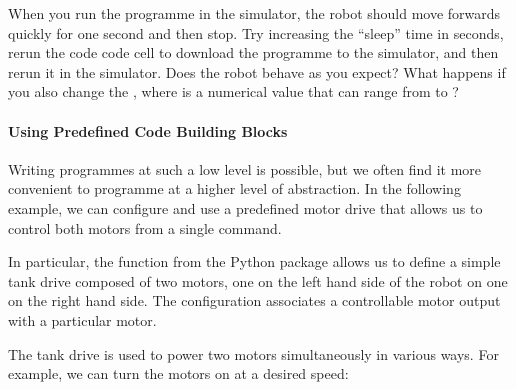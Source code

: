 \documentclass[letterpaper,10pt,english]{sphinxmanual}
\begin{document}

When you run the programme in the simulator, the robot should move forwards quickly for one second and then stop. Try increasing the “sleep” time in seconds, re\sphinxhyphen{}run the code code cell to download the programme to the simulator, and then re\sphinxhyphen{}run it in the simulator. Does the robot behave as you expect? What happens if you also change the , where  is a numerical value that can range from  to ?


\paragraph{Using Predefined Code Building Blocks}
\label{\detokenize{content/01_Robot_Lab/Section_00_01:Using-Predefined-Code-Building-Blocks}}
Writing programmes at such a low level is possible, but we often find it more convenient to programme at a higher level of abstraction. In the following example, we can configure and use a predefined motor drive that allows us to control both motors from a single command.

In particular, the  function from the  Python package allows us to define a simple tank drive composed of two motors, one on the left hand side of the robot on one on the right hand side. The configuration associates a controllable motor output with a particular motor.

\begin{sphinxVerbatim}[commandchars=\\\{\}]
   
\end{sphinxVerbatim}

The tank drive is used to power two motors simultaneously in various ways. For example, we can turn the motors on at a desired speed:

\begin{sphinxVerbatim}[commandchars=\\\{\}]
 
\end{sphinxVerbatim}
\end{document}
